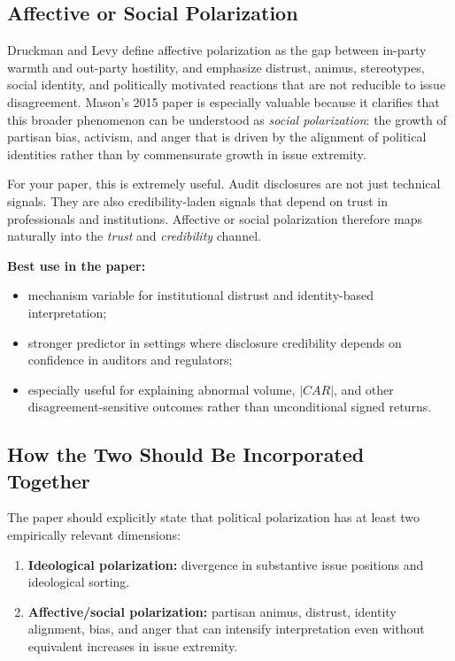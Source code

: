 \documentclass[12pt]{article}
\begin{document}
\subsection{Affective or Social Polarization}

Druckman and Levy define affective polarization as the gap between in-party warmth and out-party hostility, and emphasize distrust, animus, stereotypes, social identity, and politically motivated reactions that are not reducible to issue disagreement. \cite{druckmanlevy2021} Mason's 2015 paper is especially valuable because it clarifies that this broader phenomenon can be understood as \emph{social polarization}: the growth of partisan bias, activism, and anger that is driven by the alignment of political identities rather than by commensurate growth in issue extremity. \cite{mason2015}

For your paper, this is extremely useful. Audit disclosures are not just technical signals. They are also credibility-laden signals that depend on trust in professionals and institutions. Affective or social polarization therefore maps naturally into the \emph{trust} and \emph{credibility} channel.

\textbf{Best use in the paper:}
\begin{itemize}
    \item mechanism variable for institutional distrust and identity-based interpretation;
    \item stronger predictor in settings where disclosure credibility depends on confidence in auditors and regulators;
    \item especially useful for explaining abnormal volume, $|CAR|$, and other disagreement-sensitive outcomes rather than unconditional signed returns.
\end{itemize}

\subsection{How the Two Should Be Incorporated Together}

The paper should explicitly state that political polarization has at least two empirically relevant dimensions:

\begin{enumerate}[label=\textbf{P\arabic*.}]
    \item \textbf{Ideological polarization:} divergence in substantive issue positions and ideological sorting.
    \item \textbf{Affective/social polarization:} partisan animus, distrust, identity alignment, bias, and anger that can intensify interpretation even without equivalent increases in issue extremity.
\end{enumerate}
\end{document}
